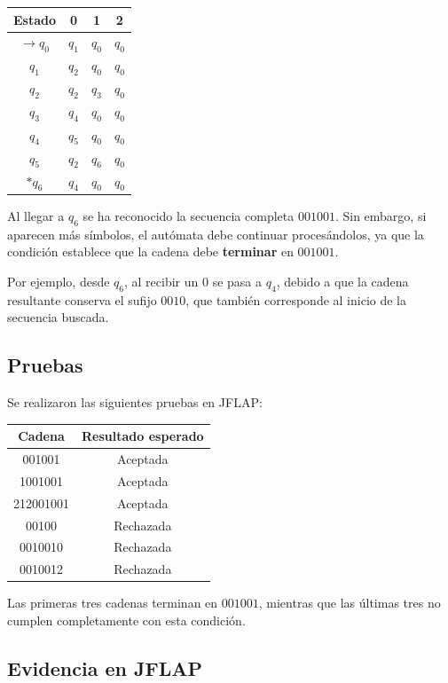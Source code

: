 \documentclass[12pt]{article}
\begin{document}
\begin{center}
\begin{tabular}{c|ccc}
Estado & 0 & 1 & 2 \\ \hline
$\rightarrow q_0$ & $q_1$ & $q_0$ & $q_0$ \\
$q_1$ & $q_2$ & $q_0$ & $q_0$ \\
$q_2$ & $q_2$ & $q_3$ & $q_0$ \\
$q_3$ & $q_4$ & $q_0$ & $q_0$ \\
$q_4$ & $q_5$ & $q_0$ & $q_0$ \\
$q_5$ & $q_2$ & $q_6$ & $q_0$ \\
$*q_6$ & $q_4$ & $q_0$ & $q_0$
\end{tabular}
\end{center}

Al llegar a $q_6$ se ha reconocido la secuencia completa $001001$.
Sin embargo, si aparecen más símbolos, el autómata debe continuar
procesándolos, ya que la condición establece que la cadena debe
\textbf{terminar} en $001001$.

Por ejemplo, desde $q_6$, al recibir un $0$ se pasa a $q_4$, debido a que
la cadena resultante conserva el sufijo $0010$, que también corresponde
al inicio de la secuencia buscada.

\subsection*{Pruebas}

Se realizaron las siguientes pruebas en JFLAP:

\begin{center}
\begin{tabular}{c|c}
Cadena & Resultado esperado \\ \hline
001001 & Aceptada \\
1001001 & Aceptada \\
212001001 & Aceptada \\
00100 & Rechazada \\
0010010 & Rechazada \\
0010012 & Rechazada
\end{tabular}
\end{center}

Las primeras tres cadenas terminan en $001001$, mientras que las últimas
tres no cumplen completamente con esta condición.

\subsection*{Evidencia en JFLAP}
\end{document}
